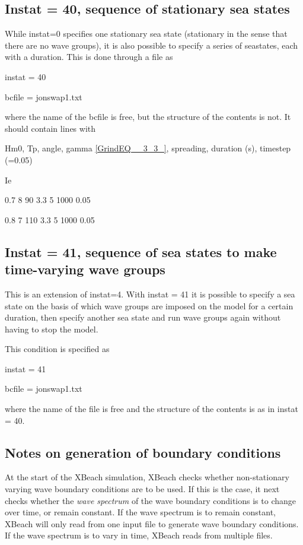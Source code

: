 \subsection{ Instat = 40, sequence of stationary sea states }

\underbar{}

While instat=0 specifies one stationary sea state (stationary in the sense that there are no wave groups), it is also possible to specify a series of seastates, each with a duration. This is done through a file as

instat   = 40

bcfile   = jonswap1.txt

where the name of the bcfile is free, but the structure of the contents is not. It should contain lines with

Hm0, Tp, angle, gamma \eqref{GrindEQ__3_3_}, spreading, duration (s), timestep (=0.05)

Ie

0.7 8 90 3.3 5 1000 0.05

0.8 7 110 3.3 5 1000 0.05


\subsection{  Instat = 41, sequence of sea states to make time-varying wave groups }

This is an extension of instat=4. With instat = 41 it is possible to specify a sea state on the basis of which wave groups are imposed on the model for a certain duration, then specify another sea state and run wave groups again without having to stop the model. 

This condition is specified as

instat   = 41

bcfile   = jonswap1.txt

where the name of the file is free and the structure of the contents is as in instat = 40.


\subsection{ Notes on generation of boundary conditions}

At the start of the XBeach simulation, XBeach checks whether non-stationary varying wave boundary conditions are to be used. If this is the case, it next checks whether the \textit{wave spectrum} of the wave boundary conditions is to change over time, or remain constant. If the wave spectrum is to remain constant, XBeach will only read from one input file to generate wave boundary conditions. If the wave spectrum is to vary in time, XBeach reads from multiple files. 

